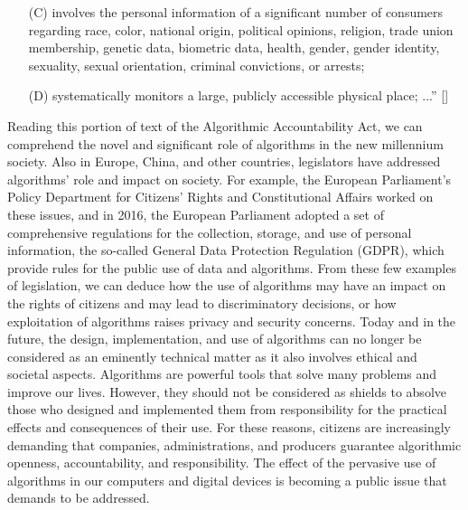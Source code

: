 {{{\begin{enumerate}
\begin{enumerate}
\item[(i)] alter legal rights of consumers; or
\item[(ii)] otherwise significantly impact consumers;
\end{enumerate}
\item[(C)] involves the personal information of a significant number of consumers regarding race, color, national origin, political opinions, religion, trade union membership, genetic data, biometric data, health, gender, gender identity, sexuality, sexual orientation, criminal convictions, or arrests;
\item[(D)] systematically monitors a large, publicly accessible physical place; ...'' \hbox{[\citealt{chap:01:AlgorithmicAccountabilityAct:2019}]}
\end{enumerate}


Reading this portion of text of the Algorithmic Accountability Act, we can comprehend the novel and significant role of algorithms in the new millennium \hbox{society.} Also in Europe, China, and other countries, legislators have addressed algorithms' role and impact on society. For example, the European Parliament's Policy Department for Citizens' Rights and Constitutional Affairs worked on these issues, and in 2016, the European Parliament adopted a set of comprehensive regulations for the collection, storage, and use of personal information, the so-called General Data Protection Regulation (GDPR), which provide rules for the public use of data and algorithms. From these few examples of legislation, we can deduce how the use of algorithms may have an impact on the rights of citizens and may lead to discriminatory decisions, or how exploitation of algorithms raises privacy and security concerns. Today and in the future, the design, implementation, and use of algorithms can no longer be considered as an eminently technical matter as it also involves ethical and societal aspects. Algorithms are powerful tools that solve many problems and improve our lives. However, they should not be considered as shields to absolve those who designed and implemented them from responsibility for the practical effects and consequences of their use. For these reasons, citizens are increasingly demanding that companies, administrations, and producers guarantee algorithmic openness, accountability, and responsibility. The effect of the pervasive use of algorithms in our computers and digital devices is becoming a public issue that demands to be addressed.


}}}

